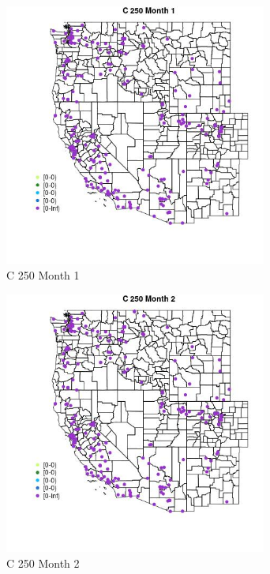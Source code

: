 \begin{figure} 
\centering  
\includegraphics[width=0.77\textwidth]{Code_Outputs/Report_ML_input_PM25_Step4_part_e_de_duplicated_aveswNAs_MapObsMo1C_250.jpg} 
\caption{\label{fig:Report_ML_input_PM25_Step4_part_e_de_duplicated_aveswNAsMapObsMo1C_250}C 250 Month 1} 
\end{figure} 
 

\begin{figure} 
\centering  
\includegraphics[width=0.77\textwidth]{Code_Outputs/Report_ML_input_PM25_Step4_part_e_de_duplicated_aveswNAs_MapObsMo2C_250.jpg} 
\caption{\label{fig:Report_ML_input_PM25_Step4_part_e_de_duplicated_aveswNAsMapObsMo2C_250}C 250 Month 2} 
\end{figure} 
 

